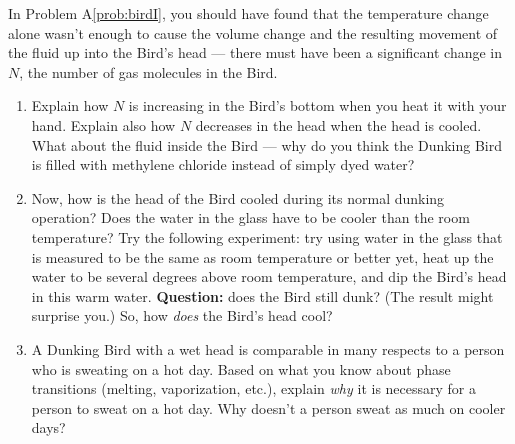 \begin{exercise} 
  In Problem A\ref{prob:birdI}, you should have found that the
  temperature change alone wasn't enough to cause the volume change
  and the resulting movement of the fluid up into the Bird's head ---
  there must have been a significant change in $N$, the number of gas
  molecules in the Bird.

  \begin{enumerate}
  \item Explain how $N$ is increasing in the Bird's bottom when you heat
    it with your hand.  Explain also how $N$ decreases in the head
    when the head is cooled.  What about the fluid inside the Bird ---
    why do you think the Dunking Bird is filled with methylene
    chloride instead of simply dyed water?

  \item Now, how is the head of the Bird cooled during its normal
    dunking operation?  Does the water in the glass have to be cooler
    than the room temperature?  Try the following experiment: try
    using water in the glass that is measured to be the same as room
    temperature or better yet, heat up the water to be several degrees
    above room temperature, and dip the Bird's head in this warm
    water.  \textbf{Question:} does the Bird still dunk?  (The result
    might surprise you.)  So, how \emph{does} the Bird's head cool?

  \item A Dunking Bird with a wet head is comparable in many respects
    to a person who is sweating on a hot day.  Based on what you know
    about phase transitions (melting, vaporization, etc.), explain
    \emph{why} it is necessary for a person to sweat on a hot day.  Why
    doesn't a person sweat as much on cooler days?
  \end{enumerate}
\end{exercise}


